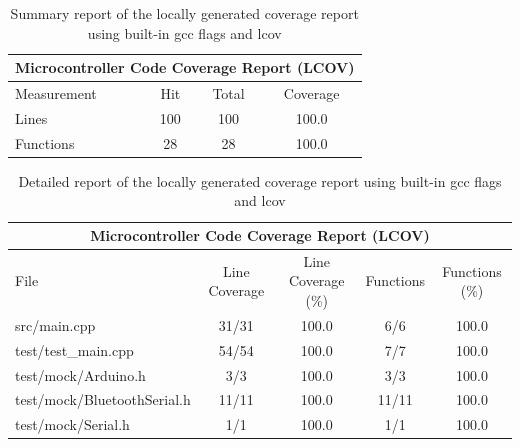 \documentclass[12pt]{article}
\begin{document}
\begin{table}[H]
    \centering
    \begin{tabular}{|l|c c|c|}
        \hline
        \multicolumn{4}{|c|}{Microcontroller Code Coverage Report (LCOV)} \\
        \hline
        Measurement & Hit & Total & Coverage \\
        \hline
        Lines       & 100 & 100 & 100.0 \\
        Functions   & 28  & 28  & 100.0 \\
        \hline
    \end{tabular}
    \caption{Summary report of the locally generated coverage report using built-in gcc flags and lcov}
    \label{tab:covsummary}
\end{table}

\begin{table}[H]
    \centering
    \begin{tabular}{|l|c c|c c|}
        \hline
        \multicolumn{5}{|c|}{Microcontroller Code Coverage Report (LCOV)} \\
        \hline
        File & Line Coverage & Line Coverage (\%) & Functions & Functions (\%) \\
        \hline
        src/main.cpp                & 31/31 & 100.0 & 6/6   & 100.0 \\
        test/test\_main.cpp         & 54/54 & 100.0 & 7/7   & 100.0 \\
        test/mock/Arduino.h         & 3/3   & 100.0 & 3/3   & 100.0 \\
        test/mock/BluetoothSerial.h & 11/11 & 100.0 & 11/11 & 100.0 \\
        test/mock/Serial.h          & 1/1   & 100.0 & 1/1   & 100.0 \\
        \hline
    \end{tabular}
    \caption{Detailed report of the locally generated coverage report using built-in gcc flags and lcov}
    \label{tab:covdetailed}
\end{table}
\end{document}
